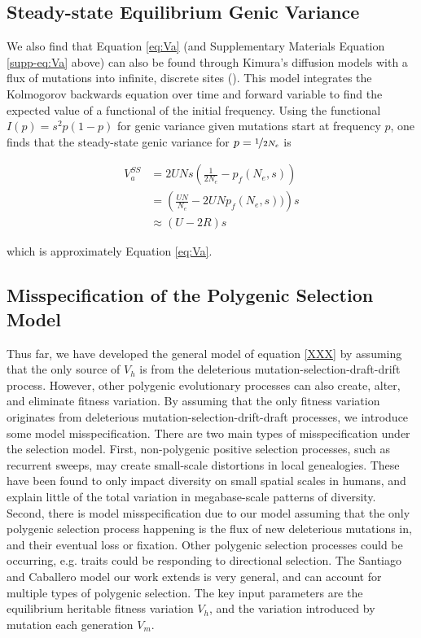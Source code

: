 \documentclass[11pt]{article}
\begin{document}
\subsection*{Steady-state Equilibrium Genic Variance} \label{supp:genic-va}

We also find that Equation \eqref{eq:Va} (and Supplementary Materials Equation
\ref{supp-eq:Va} above) can also be found through Kimura's diffusion models
with a flux of mutations into infinite, discrete sites
(\citeyear{Kimura1969-jw}). This model integrates the Kolmogorov backwards
equation over time and forward variable to find the expected value of a
functional of the initial frequency. Using the functional $I(p) = s^2 p(1-p)$
for genic variance given mutations start at frequency $p$, one finds that the
steady-state genic variance for $p=\nicefrac{1}{2N_e}$ is

\begin{align}
    V_a^{SS} &= 2 U N s \left(\frac{1}{2N_e} - p_f(N_e, s)\right) \\
             &= \left(\frac{UN}{N_e} - 2 U Np_f(N_e, s))\right)s \nonumber \\
             &\approx \left(U - 2 R\right)s \nonumber
\end{align}

which is approximately Equation \eqref{eq:Va}.

\subsection*{Misspecification of the Polygenic Selection Model}

Thus far, we have developed the general model of equation \eqref{XXX} by
assuming that the only source of $V_h$ is from the deleterious
mutation-selection-draft-drift process. However, other polygenic evolutionary
processes can also create, alter, and eliminate fitness variation. By assuming
that the only fitness variation originates from deleterious
mutation-selection-drift-draft processes, we introduce some model
misspecification. There are two main types of misspecification under the
selection model. First, non-polygenic positive selection processes, such as
recurrent sweeps, may create small-scale distortions in local genealogies.
These have been found to only impact diversity on small spatial scales
\parencite{Murphy2022-sj} in humans, and explain little of the total variation
in megabase-scale patterns of diversity. Second, there is model
misspecification due to our model assuming that the only polygenic selection
process happening is the flux of new deleterious mutations in, and their
eventual loss or fixation. Other polygenic selection processes could be
occurring, e.g. traits could be responding to directional selection. The
Santiago and Caballero model our work extends is very general, and can account
for multiple types of polygenic selection. The key input parameters are the
equilibrium heritable fitness variation $V_h$, and the variation introduced by
mutation each generation $V_m$. 
\end{document}
